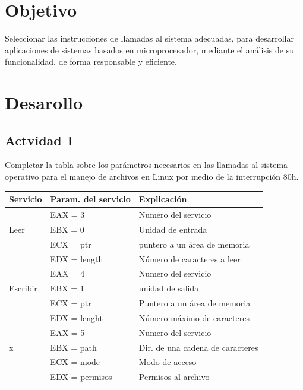 \documentclass[12pt]{article}
\begin{document}
\section*{Objetivo}
\label{sec:org0c68675}
Seleccionar las instrucciones de llamadas al sistema adecuadas, para 
desarrollar aplicaciones de sistemas basados en microprocesador, 
mediante el análisis de su funcionalidad, de forma responsable y eficiente.

\section*{Desarollo}
\label{sec:orgcbcda91}
\subsection*{Actvidad 1}
\label{sec:org75657cc}
Completar la tabla sobre los parámetros necesarios en las llamadas al
sistema operativo para el manejo de archivos en Linux por medio de la 
interrupción 80h.

\begin{center}
\begin{tabular}{|l|l|l|}
\hline
Servicio & Param. del servicio & Explicación\\
\hline
 & EAX = 3 & Numero del servicio\\
Leer & EBX = 0 & Unidad de entrada\footnotemark\\
 & ECX = ptr & puntero a un área de memoria\\
 & EDX = length & Número de caracteres a leer\\
\hline
 & EAX = 4 & Numero del servicio\\
Escribir & EBX = 1 & unidad de salida\footnotemark\\
 & ECX = ptr & Puntero a un área de memoria\\
 & EDX = lenght & Número máximo de caracteres\\
\hline
 & EAX = 5 & Numero del servicio\\
x & EBX = path & Dir. de una cadena de caracteres\\
 & ECX = mode & Modo de acceso\footnotemark\\
 & EDX = permisos & Permisos al archivo\\
\hline
\end{tabular}
\end{center}
\end{document}
